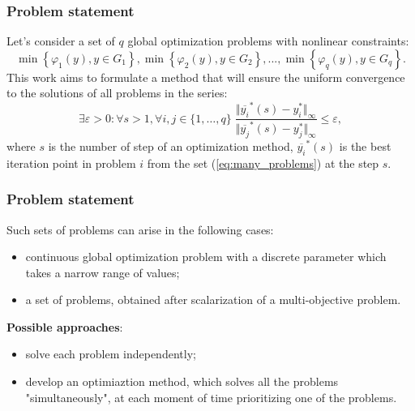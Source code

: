 \documentclass[aspectratio=1610]{beamer}
\begin{document}
\begin{frame}
  \frametitle{Problem statement}
  Let's consider a set of \(q\) global optimization problems with nonlinear constraints:
  \begin{equation}
    \label{eq:many_problems}
    \min\left\{\varphi_1(y), y\in G_1 \right\}, \min\left\{\varphi_2(y), y\in G_2\right\},...,
  \min\left\{\varphi_q(y), y\in G_q\right\}.
  \end{equation}
  This work aims to formulate a method that will ensure the uniform convergence to the
  solutions of all problems in the series:
  \begin{equation}
    \exists \varepsilon > 0: \forall s>1, \forall i,j\in\{1,\dots,q\}\;
      \frac{\Vert \overline{y_i}^*(s) - y_i^*\Vert_\infty}{\Vert \overline{y_j}^*(s) - y_j^*\Vert_	\infty} \leqslant \varepsilon,
  \end{equation}
  where \(s\) is the number of step of an optimization method, \(\overline{y_i}^*(s)\) is the best iteration point
  in problem \(i\) from the set (\ref{eq:many_problems}) at the step \(s\).

\end{frame}

\begin{frame}
  \frametitle{Problem statement}
  Such sets of problems can arise in the following cases:
  \begin{itemize}
    \item continuous global optimization problem with a discrete parameter which takes a narrow range of values;
    \item a set of problems, obtained after scalarization of a multi-objective problem.
  \end{itemize}
\textbf{Possible approaches}:
  \begin{itemize}
    \item solve each problem independently;
    \item develop an optimiaztion method, which solves all the problems "simultaneously", at each moment of time
    prioritizing one of the problems.
  \end{itemize}
\end{frame}
\end{document}
